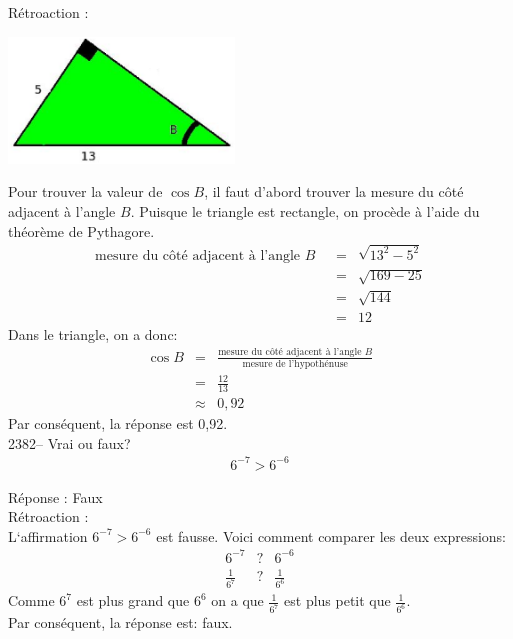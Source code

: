 \documentclass[letterpaper, 12pt]{article}
\begin{document}
R\'etroaction :\\
\begin{center}
 \includegraphics[width=6cm,bb=14 14 415 315]{Q2380.eps}
\end{center}
Pour trouver la valeur de $\cos{B}$, il faut d'abord trouver la mesure du c\^ot\'e adjacent \`a l'angle $B$. Puisque le triangle est rectangle, on proc\`ede \`a l'aide du th\'eor\`eme de Pythagore.
\begin{eqnarray*}
\textrm{mesure du c\^ot\'e adjacent \`a l'angle $B$ }&=& \sqrt{13^{2}-5^{2}}\\
&=&\sqrt{169-25}\\
&=&\sqrt{144}\\
&=&12
\end{eqnarray*}
Dans le triangle, on a donc:
\begin{eqnarray*}
 \cos{B}&=&\frac{\textrm{mesure du c\^ot\'e adjacent \`a l'angle $B$}}{\textrm{mesure de l'hypoth\'enuse}}\\
&=&\frac{12}{13}\\[2mm]
&\approx&0,92
\end{eqnarray*}
Par cons\'equent, la r\'eponse est 0,92.\\


2382--  Vrai ou faux?
\begin{eqnarray*}
6^{-7}>6^{-6}
\end{eqnarray*}

R\'eponse : Faux\\

R\'etroaction :\\
L`affirmation $6^{-7} > 6^{-6} $ est fausse. Voici comment comparer les deux expressions:
\begin{eqnarray*}
 6^{-7}& ? &6^{-6} \\
 \frac{1}{6^{7}}& ? &\frac{1}{6^{6}}
\end{eqnarray*}
Comme $6^{7}$ est plus grand que $6^{6}$ on a que $\frac{1}{6^{7}}$ est plus petit que $\frac{1}{6^{6}}$.\\
Par cons\'equent, la r\'eponse est: faux.\\
\end{document}
